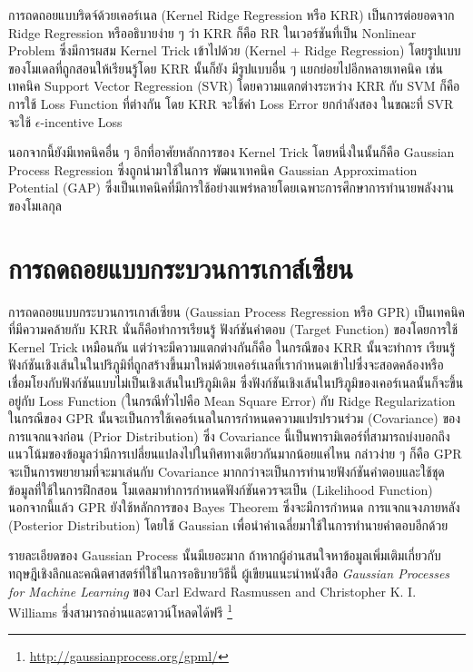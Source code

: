 การถดถอยแบบริดจ์ด้วยเคอร์เนล (Kernel Ridge Regression หรือ KRR) เป็นการต่อยอดจาก Ridge Regression หรืออธิบายง่าย ๆ ว่า KRR ก็คือ RR ในเวอร์ชันที่เป็น Nonlinear 
Problem ซึ่งมีการผสม Kernel Trick เข้าไปด้วย (Kernel + Ridge Regression) โดยรูปแบบของโมเดลที่ถูกสอนให้เรียนรู้โดย KRR นั้นก็ยัง%
มีรูปแบบอื่น ๆ แยกย่อยไปอีกหลายเทคนิค เช่น เทคนิค Support Vector Regression (SVR) โดยความแตกต่างระหว่าง KRR กับ SVM ก็คือการใช้
Loss Function ที่ต่างกัน โดย KRR จะใช้ค่า Loss Error ยกกำลังสอง ในขณะที่ SVR จะใช้ $\epsilon$-incentive Loss

นอกจากนี้ยังมีเทคนิคอื่น ๆ อีกที่อาศัยหลักการของ Kernel Trick โดยหนึ่งในนั้นก็คือ Gaussian Process Regression ซึ่งถูกนำมาใช้ในการ%
พัฒนาเทคนิค Gaussian Approximation Potential (GAP) ซึ่งเป็นเทคนิคที่มีการใช้อย่างแพร่หลายโดยเฉพาะการศึกษาการทำนายพลังงาน%
ของโมเลกุล

\section{การถดถอยแบบกระบวนการเกาส์เซียน}
\label{sec:gaussian_process}

การถดถอยแบบกระบวนการเกาส์เซียน (Gaussian Process Regression หรือ GPR)  เป็นเทคนิคที่มีความคล้ายกับ KRR นั่นก็คือทำการเรียนรู้
ฟังก์ชันคำตอบ (Target Function) ของโดยการใช้ Kernel Trick เหมือนกัน แต่ว่าจะมีความแตกต่างกันก็คือ ในกรณีของ KRR นั้นจะทำการ%
เรียนรู้ฟังก์ชันเชิงเส้นในในปริภูมิที่ถูกสร้างขึ้นมาใหม่ด้วยเคอร์เนลที่เรากำหนดเข้าไปซึ่งจะสอดคล้องหรือเชื่อมโยงกับฟังก์ชันแบบไม่เป็นเชิงเส้นในปริภูมิเดิม 
ซึ่งฟังก์ชันเชิงเส้นในปริภูมิของเคอร์เนลนั้นก็จะขึ้นอยู่กับ Loss Function (ในกรณีทั่วไปคือ Mean Square Error) กับ Ridge Regularization 
ในกรณีของ GPR นั้นจะเป็นการใช้เคอร์เนลในการกำหนดความแปรปรวนร่วม (Covariance) ของการแจกแจงก่อน (Prior Distribution) 
ซึ่ง Covariance นี้เป็นพารามิเตอร์ที่สามารถบ่งบอกถึงแนวโน้มของข้อมูลว่ามีการเปลี่ยนแปลงไปในทิศทางเดียวกันมากน้อยแค่ไหน 
กล่าวง่าย ๆ ก็คือ GPR จะเป็นการพยายามที่จะมาเล่นกับ Covariance มากกว่าจะเป็นการทำนายฟังก์ชันคำตอบและใช้ชุดข้อมูลที่ใช้ในการฝึกสอน%
โมเดลมาทำการกำหนดฟังก์ชันควรจะเป็น (Likelihood Function) นอกจากนี้แล้ว GPR ยังใช้หลักการของ Bayes Theorem ซึ่งจะมีการกำหนด%
การแจกแจงภายหลัง (Posterior Distribution) โดยใช้ Gaussian เพื่อนำค่าเฉลี่ยมาใช้ในการทำนายคำตอบอีกด้วย

รายละเอียดของ Gaussian Process นั้นมีเยอะมาก ถ้าหากผู้อ่านสนใจหาข้อมูลเพิ่มเติมเกี่ยวกับทฤษฎีเชิงลึกและคณิตศาสตร์ที่ใช้ในการอธิบายวิธีนี้
ผู้เขียนแนะนำหนังสือ \textit{Gaussian Processes for Machine Learning} ของ Carl Edward Rasmussen and 
Christopher K. I. Williams ซึ่งสามารถอ่านและดาวน์โหลดได้ฟรี \footnote{\url{http://gaussianprocess.org/gpml/}}

